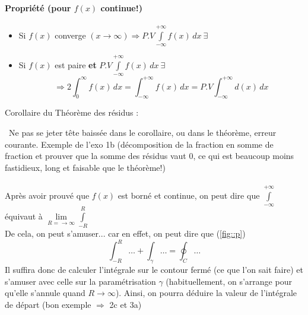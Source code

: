  \paragraph{Propriété (pour $f(x)$ continue!)} \begin{itemize}
 \item Si $f(x)$ converge $(x\rightarrow\infty)\Rightarrow P.V\displaystyle\int\limits_{-\infty}^{+\infty}f(x)\,dx\ \exists$
 \item Si $f(x)$ est paire \textbf{et} $P.V\displaystyle\int\limits_{-\infty}^{+\infty}f(x)\,dx\ \exists$ $$\Rightarrow 2\int_0^{\infty}f(x)\,dx=\int_{-\infty}^{+\infty}f(x)\,dx=P.V\int_{-\infty}^{+\infty}d(x)\,dx$$
 \end{itemize}
Corollaire du Théorème des résidus : \begin{center}
      \end{center}
\danger\ Ne pas se jeter tête baissée dans le corollaire, ou dans le théorème, erreur courante. Exemple de l'exo 1b (décomposition de la fraction en somme de fraction et prouver que la somme des résidus vaut 0, ce qui est beaucoup moins fastidieux, long et faisable que le théorème!)\\\\ 

Après avoir prouvé que $f(x)$ est borné et continue, on peut dire que $\displaystyle\int\limits_{-\infty}^{+\infty}$ équivaut à $\lim\limits_{R=\rightarrow\infty}\displaystyle\int\limits_{-R}^R$\\ 
De cela, on peut s'amuser... car en effet, on peut dire que (\autoref{fig::p}) $$\int_{-R}^R\dots+\int_{\gamma}\dots=\oint_C\dots$$ Il suffira donc de calculer l'intégrale sur le contour fermé (ce que l'on sait faire) et s'amuser avec celle sur la paramétrisation $\gamma$ (habituellement, on s'arrange pour qu'elle s'annule quand $R\rightarrow\infty$). Ainsi, on pourra déduire la valeur de l'intégrale de départ (bon exemple $\Rightarrow$ 2c et 3a)
